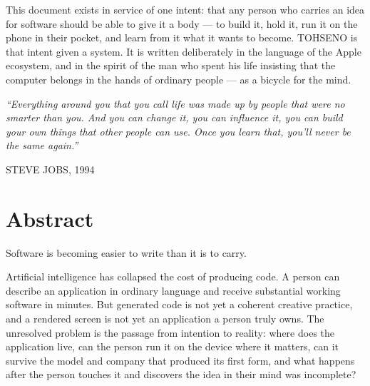 \documentclass[11pt]{article}
\newcommand{\TOH}{TOHSENO}
\begin{document}
\thispagestyle{empty}
\vspace*{2.0in}
\begin{center}
\begin{minipage}{0.82\textwidth}
This document exists in service of one intent: that any person who
carries an idea for software should be able to give it a body --- to
build it, hold it, run it on the phone in their pocket, and learn from
it what it wants to become. \TOH{} is that intent given a system. It is
written deliberately in the language of the Apple ecosystem, and in the
spirit of the man who spent his life insisting that the computer belongs
in the hands of ordinary people --- as a bicycle for the mind.
\end{minipage}

\vspace{1.6in}
\begin{minipage}{0.82\textwidth}
\itshape\large
``Everything around you that you call life was made up by people that
were no smarter than you. And you can change it, you can influence it,
you can build your own things that other people can use. Once you learn
that, you'll never be the same again.''
\end{minipage}

\vspace{1em}
{\monolabel\scriptsize\color{halide}STEVE JOBS, 1994\par}
\end{center}
\clearpage

\section*{Abstract}

Software is becoming easier to write than it is to carry.

Artificial intelligence has collapsed the cost of producing code. A
person can describe an application in ordinary language and receive
substantial working software in minutes. But generated code is not yet a
coherent creative practice, and a rendered screen is not yet an
application a person truly owns. The unresolved problem is the passage
from intention to reality: where does the application live, can the
person run it on the device where it matters, can it survive the model
and company that produced its first form, and what happens after the
person touches it and discovers the idea in their mind was incomplete?
\end{document}
